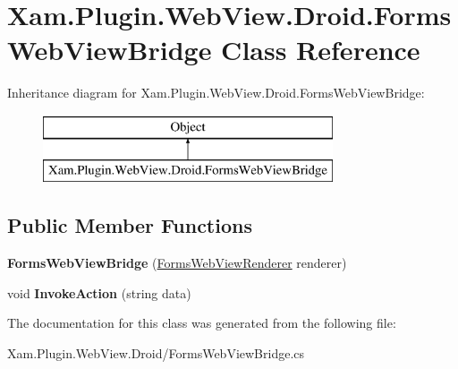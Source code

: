 \hypertarget{class_xam_1_1_plugin_1_1_web_view_1_1_droid_1_1_forms_web_view_bridge}{}\section{Xam.\+Plugin.\+Web\+View.\+Droid.\+Forms\+Web\+View\+Bridge Class Reference}
\label{class_xam_1_1_plugin_1_1_web_view_1_1_droid_1_1_forms_web_view_bridge}
Inheritance diagram for Xam.\+Plugin.\+Web\+View.\+Droid.\+Forms\+Web\+View\+Bridge\+:\begin{figure}[H]
\begin{center}
\leavevmode
\includegraphics[height=2.000000cm]{class_xam_1_1_plugin_1_1_web_view_1_1_droid_1_1_forms_web_view_bridge}
\end{center}
\end{figure}
\subsection*{Public Member Functions}
\begin{DoxyCompactItemize}
\item 
\mbox{\label{class_xam_1_1_plugin_1_1_web_view_1_1_droid_1_1_forms_web_view_bridge_a85ff4d9211eee84ae4a37711c61de48b}} 
{\bfseries Forms\+Web\+View\+Bridge} (\hyperlink{class_xam_1_1_plugin_1_1_web_view_1_1_droid_1_1_forms_web_view_renderer}{Forms\+Web\+View\+Renderer} renderer)
\item 
\mbox{\label{class_xam_1_1_plugin_1_1_web_view_1_1_droid_1_1_forms_web_view_bridge_a5e5d682d583fab5e486c3bca8284804e}} 
void {\bfseries Invoke\+Action} (string data)
\end{DoxyCompactItemize}


The documentation for this class was generated from the following file\+:\begin{DoxyCompactItemize}
\item 
Xam.\+Plugin.\+Web\+View.\+Droid/Forms\+Web\+View\+Bridge.\+cs\end{DoxyCompactItemize}
